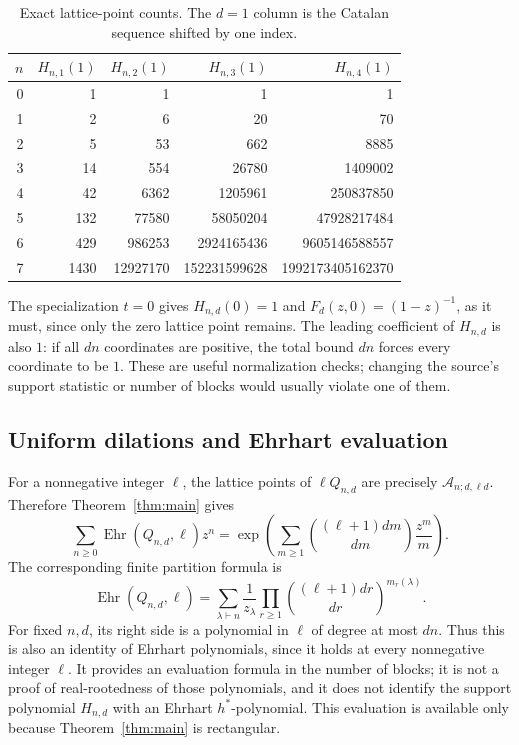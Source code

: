 \documentclass[11pt]{article}
\numberwithin{equation}{section}
\theoremstyle{definition}
\DeclareMathOperator{\Ehr}{Ehr}
\begin{document}
\begin{table}[htbp]
\centering
\small
\begin{tabular}{r r r r r}
\toprule
$n$ & $H_{n,1}(1)$ & $H_{n,2}(1)$ & $H_{n,3}(1)$ & $H_{n,4}(1)$\\
\midrule
0&1&1&1&1\\
1&2&6&20&70\\
2&5&53&662&8885\\
3&14&554&26780&1409002\\
4&42&6362&1205961&250837850\\
5&132&77580&58050204&47928217484\\
6&429&986253&2924165436&9605146588557\\
7&1430&12927170&152231599628&1992173405162370\\
\bottomrule
\end{tabular}
\caption{Exact lattice-point counts. The $d=1$ column is the Catalan sequence
shifted by one index.}\label{tab:counts}
\end{table}

The specialization $t=0$ gives $H_{n,d}(0)=1$ and $F_d(z,0)=(1-z)^{-1}$,
as it must, since only the zero lattice point remains.
The leading coefficient of $H_{n,d}$ is also $1$: if all $dn$ coordinates are
positive, the total bound $dn$ forces every coordinate to be $1$.
These are useful normalization checks; changing the source's support
statistic or number of blocks would usually violate one of them.

\subsection{Uniform dilations and Ehrhart evaluation}
For a nonnegative integer $\ell$, the lattice points of $\ell Q_{n,d}$ are
precisely $\mathcal A_{n;d,\ell d}$. Therefore Theorem~\ref{thm:main} gives
\begin{equation}
 \sum_{n\geq0}\Ehr(Q_{n,d},\ell)z^n
 =\exp\left(\sum_{m\geq1}\binom{(\ell+1)dm}{dm}\frac{z^m}{m}\right).
 \label{eq:ehrhart}
\end{equation}
The corresponding finite partition formula is
\begin{equation}
 \Ehr(Q_{n,d},\ell)
 =\sum_{\lambda\vdash n}\frac1{z_\lambda}
       \prod_{r\geq1}\binom{(\ell+1)dr}{dr}^{m_r(\lambda)}.
 \label{eq:ehrhartpoly}
\end{equation}
For fixed $n,d$, its right side is a polynomial in $\ell$ of degree at most
$dn$. Thus this is also an identity of Ehrhart polynomials, since it holds
at every nonnegative integer $\ell$. It provides an evaluation formula in the
number of blocks; it is not a proof of real-rootedness of those polynomials,
and it does not identify the support polynomial $H_{n,d}$ with an Ehrhart
$h^*$-polynomial. This evaluation is available only because
Theorem~\ref{thm:main} is rectangular.
\end{document}
